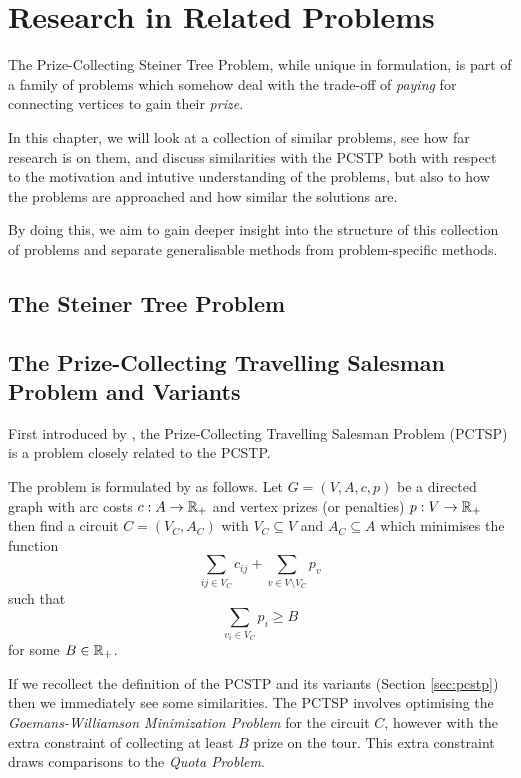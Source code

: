 \chapter{Research in Related Problems}
\label{chap:related}
The Prize-Collecting Steiner Tree Problem, while unique in formulation,
is part of a family of problems which somehow deal with the trade-off of
\textit{paying} for connecting vertices to gain their \textit{prize}.

In this chapter, we will look at a collection of similar problems, see how far research is
on them, and discuss similarities with the PCSTP both with respect to the motivation and
intutive understanding of the problems, but also to how the problems are approached and
how similar the solutions are.

By doing this, we aim to gain deeper insight into the structure of this collection of problems
 and separate generalisable methods from problem-specific methods.



\section{The Steiner Tree Problem}
\section{The Prize-Collecting Travelling Salesman Problem and Variants}
First introduced by \citet*{balas1989prize}, the Prize-Collecting Travelling Salesman Problem
(PCTSP) is a problem closely related to the PCSTP.

The problem is formulated by \citeauthor{balas1989prize} as follows. Let
$G = (V, A, c, p)$ be a directed
graph with arc costs $c: A \to \mathbb{R}_+$ and vertex prizes (or penalties) $p: V \to \mathbb{R}_+$
then find a circuit $C = (V_C, A_C)$ with $V_C \subseteq V$ and $A_C \subseteq A$ which
minimises the function
$$\sum_{ij \in V_C} c_{ij} + \sum_{v \in V \setminus V_C} p_v$$
such that
$$\sum_{v_i \in V_C} p_i \geq B$$
for some $B \in \mathbb{R}_+$.

If we recollect the definition of the PCSTP and its variants (Section \ref{sec:pcstp}) then
we immediately see some similarities. The PCTSP involves optimising the
\textit{Goemans-Williamson Minimization Problem} for the circuit $C$, however with the extra
constraint of collecting at least $B$ prize on the tour. This extra constraint draws comparisons
to the \textit{Quota Problem}.

